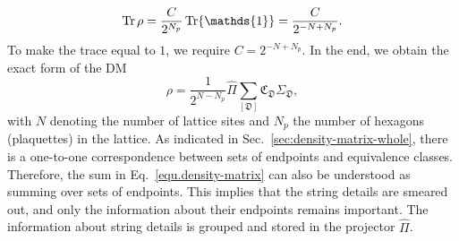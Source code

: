 \[
\Tr\rho = \frac{C}{2^{N_p}}\Tr\mathds{1} = \frac{C}{2^{-N+N_p}}.
\]
To make the trace equal to $1$, we require $C = 2^{-N+N_p}$. 
In the end, we obtain the exact form of the DM
\begin{equation}\label{equ.density-matrix}
    \rho =  \frac{1}{2^{N-N_p}}\hat{\Pi}\sum_{[\mathfrak{D}]}\mathfrak{C}_{\mathfrak{D}}\Sigma_{\mathfrak{D}},
\end{equation}
{with $N$ denoting the number of lattice sites and $N_p$ the number of hexagons (plaquettes) in the lattice}. As indicated in Sec.~\ref{sec:density-matrix-whole}, there is a one-to-one correspondence between sets of endpoints and equivalence classes. Therefore, the sum in Eq.~\eqref{equ.density-matrix} can also be understood as summing over sets of endpoints. This implies that the string details are smeared out, and only the information about their endpoints remains important. The information about string details is grouped and stored in the projector $\hat{\Pi}$.
